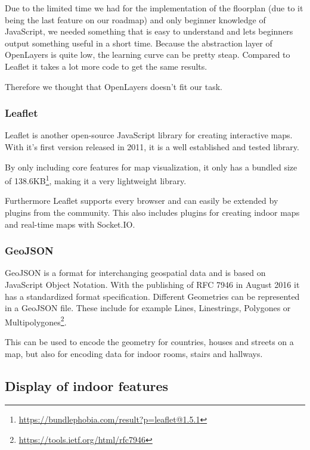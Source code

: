 Due to the limited time we had for the implementation of the floorplan (due to it being the last feature on our roadmap) and only beginner knowledge of JavaScript, we needed something that is easy to understand and lets beginners output something useful in a short time. Because the abstraction layer of OpenLayers  is quite low, the learning curve can be pretty steap. Compared to Leaflet it takes a lot more code to get the same results.

Therefore we thought that OpenLayers doesn't fit our task.

\subsubsection{Leaflet}
\label{Leaflet}

Leaflet is another open-source JavaScript library for creating interactive maps. With it's first version released in 2011, it is a well established and tested library. 

By only including core features for map visualization, it only has a bundled size of 138.6KB\footnote{\url{https://bundlephobia.com/result?p=leaflet@1.5.1}}, making it a very lightweight library.

Furthermore Leaflet supports every browser and can easily be extended by plugins from the community.
This also includes plugins for creating indoor maps \cite{baines_provides_2019} and real-time maps with Socket.IO.

\subsubsection{GeoJSON}
\label{GeoJSON}

GeoJSON is a format for interchanging geospatial data and is based on JavaScript Object Notation. With the publishing of RFC 7946 in August 2016 it has a standardized format specification.
Different Geometries can be represented in a GeoJSON file. These include for example Lines, Linestrings, Polygones or Multipolygones\footnote{\url{https://tools.ietf.org/html/rfc7946}}. 

This can be used to encode the geometry for countries, houses and streets on a map, but also for encoding data for indoor rooms, stairs and hallways.


\subsection{Display of indoor features}
\label{Display of indoor features}

